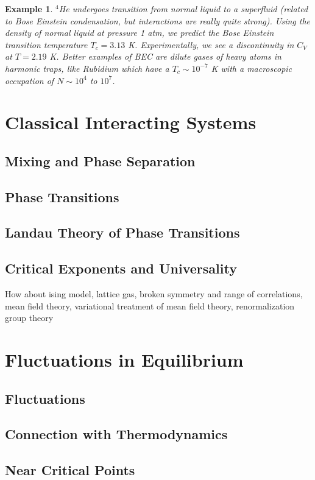 \documentclass[a4paper]{article}
\newtheorem{eg}{Example}[section]
\theoremstyle{new}
\begin{document}
\begin{eg}
$^4$He undergoes transition from normal liquid to a superfluid (related to Bose Einstein condensation, but interactions are really quite strong). Using the density of normal liquid at pressure 1 atm, we predict the Bose Einstein transition temperature $T_c=3.13$ K. Experimentally, we see a discontinuity in $C_V$ at $T=2.19$ K. Better examples of BEC are dilute gases of heavy atoms in harmonic traps, like Rubidium which have a $T_c\sim 10^{-7}$ K with a macroscopic occupation of $N\sim10^4$ to $10^7$.
\end{eg}
\newpage
\section{Classical Interacting Systems}
\subsection{Mixing and Phase Separation}
\subsection{Phase Transitions}
\subsection{Landau Theory of Phase Transitions}
\subsection{Critical Exponents and Universality}
How about ising model, lattice gas, broken symmetry and range of correlations, mean field theory, variational treatment of mean field theory, renormalization group theory


\newpage
\section{Fluctuations in Equilibrium}
\subsection{Fluctuations}
\subsection{Connection with Thermodynamics}
\subsection{Near Critical Points}
\end{document}
